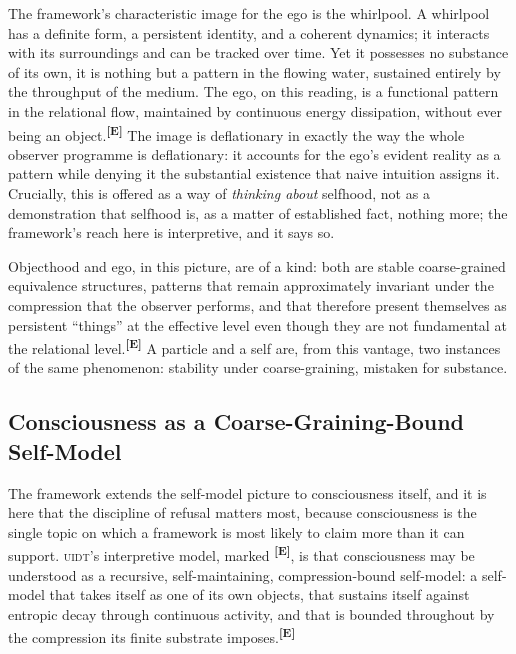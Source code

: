 \documentclass[12pt,a4paper,twoside]{article}
\theoremstyle{plain}
\theoremstyle{definition}
\theoremstyle{remark}
\newcommand{\UIDT}{\textsc{uidt}}
\newcommand{\catmark}[1]{\textsuperscript{\textsf{\textbf{[#1]}}}}
\begin{document}
The framework's characteristic image for the ego is the whirlpool. A whirlpool has a definite form, a persistent identity, and a coherent dynamics; it interacts with its surroundings and can be tracked over time. Yet it possesses no substance of its own, it is nothing but a pattern in the flowing water, sustained entirely by the throughput of the medium. The ego, on this reading, is a functional pattern in the relational flow, maintained by continuous energy dissipation, without ever being an object.\catmark{E} The image is deflationary in exactly the way the whole observer programme is deflationary: it accounts for the ego's evident reality as a pattern while denying it the substantial existence that naive intuition assigns it. Crucially, this is offered as a way of \emph{thinking about} selfhood, not as a demonstration that selfhood is, as a matter of established fact, nothing more; the framework's reach here is interpretive, and it says so.

Objecthood and ego, in this picture, are of a kind: both are stable coarse-grained equivalence structures, patterns that remain approximately invariant under the compression that the observer performs, and that therefore present themselves as persistent ``things'' at the effective level even though they are not fundamental at the relational level.\catmark{E} A particle and a self are, from this vantage, two instances of the same phenomenon: stability under coarse-graining, mistaken for substance.

\subsection{Consciousness as a Coarse-Graining-Bound Self-Model}
\label{subsec:consciousness-coarse-graining}

The framework extends the self-model picture to consciousness itself, and it is here that the discipline of refusal matters most, because consciousness is the single topic on which a framework is most likely to claim more than it can support. \UIDT's interpretive model, marked \catmark{E}, is that consciousness may be understood as a recursive, self-maintaining, compression-bound self-model: a self-model that takes itself as one of its own objects, that sustains itself against entropic decay through continuous activity, and that is bounded throughout by the compression its finite substrate imposes.\catmark{E}
\end{document}
